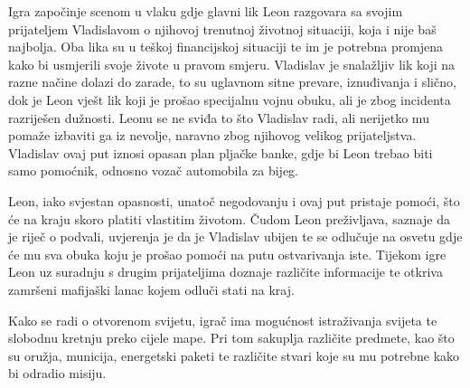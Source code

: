 Igra započinje scenom u vlaku gdje glavni lik Leon razgovara sa svojim prijateljem Vladislavom o njihovoj trenutnoj životnoj situaciji, koja i nije baš najbolja. Oba lika su u teškoj financijskoj situaciji te im je potrebna promjena kako bi usmjerili svoje živote u pravom smjeru. Vladislav je snalažljiv lik koji na razne načine dolazi do zarade, to su uglavnom sitne prevare, iznuđivanja i slično, dok je Leon vješt lik koji je prošao specijalnu vojnu obuku, ali je zbog incidenta razriješen dužnosti. Leonu se ne sviđa to što Vladislav radi, ali nerijetko mu pomaže izbaviti ga iz nevolje, naravno zbog njihovog velikog prijateljstva. Vladislav ovaj put iznosi opasan plan pljačke banke, gdje bi Leon trebao biti samo pomoćnik, odnosno vozač automobila za bijeg.

Leon, iako svjestan opasnosti, unatoč negodovanju i ovaj put pristaje pomoći, što će na kraju skoro platiti vlastitim životom. Čudom Leon preživljava, saznaje da je riječ o podvali, uvjerenja je da je Vladislav ubijen te se odlučuje na osvetu gdje će mu sva obuka koju je prošao pomoći na putu ostvarivanja iste. Tijekom igre Leon uz suradnju s drugim prijateljima doznaje različite informacije te otkriva zamršeni mafijaški lanac kojem odluči stati na kraj.

Kako se radi o otvorenom svijetu, igrač ima mogućnost istraživanja svijeta te slobodnu kretnju preko cijele mape. Pri tom sakuplja različite predmete, kao što su oružja, municija, energetski paketi te različite stvari koje su mu potrebne kako bi odradio misiju.





 
